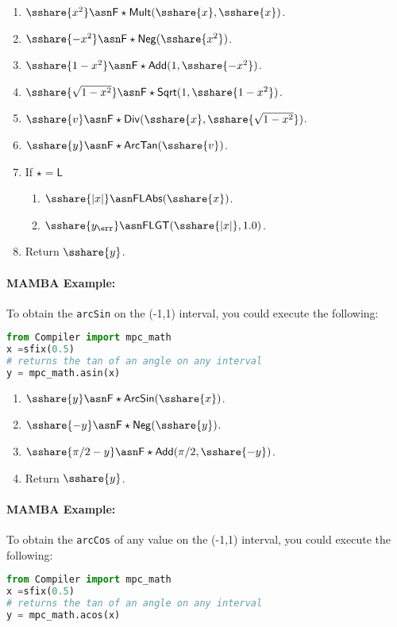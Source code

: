 \begin{enumerate}
  \item $\sshare{x^2} \asn \mathsf{F\star Mult}(\sshare{x},\sshare{x})$.
  \item $\sshare{-x^2} \asn \mathsf{F\star Neg}(\sshare{x^2})$.
  \item $\sshare{1-x^2} \asn \mathsf{F\star Add}(1,\sshare{-x^2})$.
  \item $\sshare{\sqrt{1-x^2}} \asn \mathsf{F\star Sqrt}(1,\sshare{1-x^2})$.
  \item $\sshare{v} \asn \mathsf{F\star Div}(\sshare{x},\sshare{\sqrt{1-x^2}})$.
  \item $\sshare{y} \asn \mathsf{F\star ArcTan}(\sshare{v})$.
  \item If $\star=\mathsf{L}$
        \begin{enumerate}
          \item $\sshare{|x|} \asn \mathsf{FLAbs}(\sshare{x})$.
          \item $\sshare{y_\err} \asn \mathsf{FLGT}(\sshare{|x|},1.0)$.
        \end{enumerate}
  \item Return $\sshare{y}$.
\end{enumerate}


\paragraph{MAMBA Example:} To obtain the \verb|arcSin| on the  (-1,1) interval, you could execute the following:
\begin{lstlisting}[language={python}]
from Compiler import mpc_math
x =sfix(0.5)
# returns the tan of an angle on any interval
y = mpc_math.asin(x)
\end{lstlisting}


\begin{enumerate}
  \item $\sshare{y} \asn \mathsf{F\star ArcSin}(\sshare{x})$.
  \item $\sshare{-y} \asn \mathsf{F\star Neg}(\sshare{y})$.
  \item $\sshare{\pi/2-y} \asn \mathsf{F\star Add}(\pi/2,\sshare{-y})$.
  \item Return $\sshare{y}$.
\end{enumerate}

\paragraph{MAMBA Example:} To obtain the \verb|arcCos| of any value on the (-1,1) interval, you could execute the following:
\begin{lstlisting}[language={python}]
from Compiler import mpc_math
x =sfix(0.5)
# returns the tan of an angle on any interval
y = mpc_math.acos(x)
\end{lstlisting}

